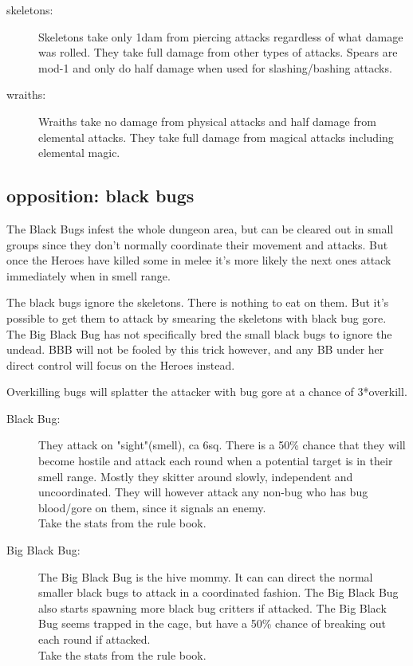 \begin{description}
\item[skeletons:] Skeletons take only 1dam from piercing attacks regardless of what damage was rolled. They take full damage from other types of attacks. Spears are mod-1 and only do half damage when used for slashing/bashing attacks.

\item[wraiths:] Wraiths take no damage from physical attacks and half damage from elemental attacks. They take full damage from magical attacks including elemental magic.

\end{description}


\subsection*{opposition: black bugs}

The Black Bugs infest the whole dungeon area, but can be cleared out in small groups since they don't normally coordinate their movement and attacks. But once the Heroes have killed some in melee it's more likely the next ones attack immediately when in smell range.

The black bugs ignore the skeletons. There is nothing to eat on them. But it's possible to get them to attack by smearing the skeletons with black bug gore. The Big Black Bug has not specifically bred the small black bugs to ignore the undead. BBB will not be fooled by this trick however, and any BB under her direct control will focus on the Heroes instead.

Overkilling bugs will splatter the attacker with bug gore at a chance of 3*overkill.

\begin{description}

\item[Black Bug:] They attack on "sight"(smell), ca 6sq. There is a 50\% chance that they will become hostile and attack each round when a potential target is in their smell range. Mostly they skitter around slowly, independent and uncoordinated. They will however attack any non-bug who has bug blood/gore on them, since it signals an enemy.\\
Take the stats from the rule book.

\item[Big Black Bug:] The Big Black Bug is the hive mommy. It can can direct the normal smaller black bugs to attack in a coordinated fashion. The Big Black Bug also starts spawning more black bug critters if attacked. The Big Black Bug seems trapped in the cage, but have a 50\% chance of breaking out each round if attacked.\\
Take the stats from the rule book.

\end{description}


